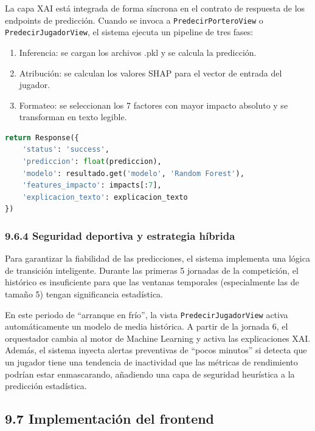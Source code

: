 La capa XAI está integrada de forma síncrona en el contrato de respuesta de los endpoints de predicción. Cuando se invoca a \texttt{PredecirPorteroView} o
\texttt{PredecirJugadorView}, el sistema ejecuta un pipeline de tres fases:
 
\begin{enumerate}
\item Inferencia: se cargan los archivos .pkl y se calcula la predicción.
\item Atribución: se calculan los valores SHAP para el vector de entrada del jugador.
\item Formateo: se seleccionan los 7 factores con mayor impacto absoluto y se transforman en texto legible.
\end{enumerate}
 
\begin{lstlisting}[language=Python,caption={Contrato de respuesta API con metadatos de predicción y explicación para transparencia}]
return Response({
    'status': 'success',
    'prediccion': float(prediccion),
    'modelo': resultado.get('modelo', 'Random Forest'),
    'features_impacto': impacts[:7],
    'explicacion_texto': explicacion_texto
})
\end{lstlisting}
 
\subsubsection{9.6.4 Seguridad deportiva y estrategia híbrida}
 
Para garantizar la fiabilidad de las predicciones, el sistema implementa una lógica de transición inteligente. Durante las primeras 5 jornadas de la
competición, el histórico es insuficiente para que las ventanas temporales (especialmente las de tamaño 5) tengan significancia estadística.
 
En este periodo de ``arranque en frío'', la vista \texttt{PredecirJugadorView} activa automáticamente un modelo de media histórica. A partir de la
jornada 6, el orquestador cambia al motor de Machine Learning y activa las explicaciones XAI. Además, el sistema inyecta alertas
preventivas de ``pocos minutos'' si detecta que un jugador tiene una tendencia de inactividad que las métricas de rendimiento podrían estar enmascarando,
añadiendo una capa de seguridad heurística a la predicción estadística.
 
\subsection{9.7 Implementación del frontend}
 
